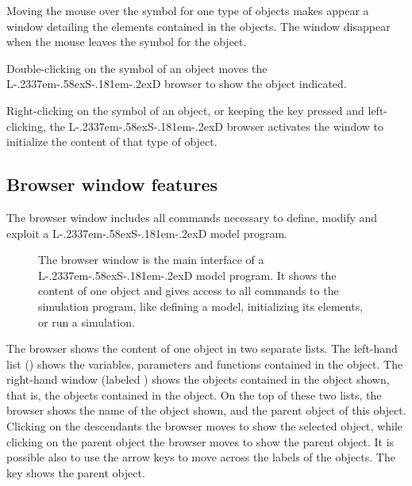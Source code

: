 \documentclass [11pt,a4paper] {book}
\def\LsD{{L\kern-.2337em\lower-.58ex\hbox{S}\kern-.181em\lower-.2ex\hbox{D}}\xspace}
\begin{document}
Moving the mouse over the symbol for one type of objects makes appear a window detailing the elements contained in the objects. The window disappear when the mouse leaves the symbol for the object.

Double-clicking on the symbol of an object moves the \LsD browser to show the object indicated.

Right-clicking on the symbol of an object, or keeping the key  pressed and left-clicking, the \LsD browser activates the window to initialize the content of that type of object.



\subsection{Browser window features}
The browser window includes all commands necessary to define, modify and exploit a \LsD model program. 

\begin{figure}[ht]
  \centering
  \caption{\small The browser window is the main interface of a \LsD model program. It shows the content of one object and gives access to all commands to the simulation program, like defining a model, initializing its elements, or run a simulation.}
   \label{fig:browser1}
\end{figure}

The browser shows the content of one object in two separate lists. The left-hand list () shows the variables, parameters and functions contained in the object. The right-hand window (labeled ) shows the objects contained in the object shown, that is, the objects contained in the object. On the top of these two lists, the browser shows the name of the object shown, and the parent object of this object. Clicking on the descendants the browser moves to show the selected object, while clicking on the parent object the browser moves to show the parent object. It is possible also to use the arrow keys to move across the labels of the objects. The key  shows the parent object.
\end{document}
